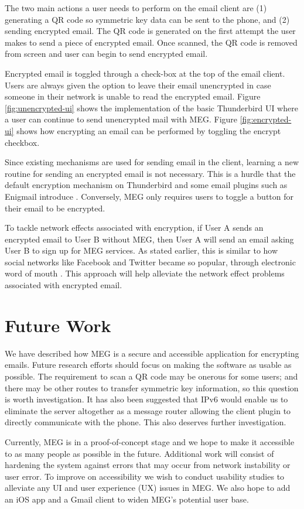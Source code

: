 \documentclass[10pt]{article}
\begin{document}
\begin{multicols}{2}
\par The two main actions a user needs to perform on the email client are (1) generating a QR code so symmetric key data can be sent to the phone, and (2) sending encrypted email. The QR code is generated on the first attempt the user makes to send a piece of encrypted email. Once scanned, the QR code is removed from screen and user can begin to send encrypted email.
\par Encrypted email is toggled through a check-box at the top of the email client. Users are always given the option to leave their email unencrypted in case someone in their network is unable to read the encrypted email. Figure \ref{fig:unencrypted-ui} shows the implementation of the basic Thunderbird UI where a user can continue to send unencrypted mail with MEG. Figure \ref{fig:encrypted-ui} shows how encrypting an email can be performed by toggling the encrypt checkbox.
\par Since existing mechanisms are used for sending email in the client, learning a new routine for sending an encrypted email is not necessary. This is a hurdle that the default encryption mechanism on Thunderbird and some email plugins such as Enigmail introduce \cite{enigmail-handbook}. Conversely, MEG only requires users to toggle a button for their email to be encrypted.
\par To tackle network effects associated with encryption, if User A sends an encrypted email to User B without MEG, then User A will send an email asking User B to sign up for MEG services. As stated earlier, this is similar to how social networks like Facebook and Twitter became so popular, through electronic word of mouth \cite{trusov2009effects}. This approach will help alleviate the network effect problems associated with encrypted email.
\section{Future Work}
\par We have described how MEG is a secure and accessible application for encrypting emails. Future research efforts should focus on making the software as usable as possible. The requirement to scan a QR code may be onerous for some users; and there may be other routes to transfer symmetric key information, so this question is worth investigation. It has also been suggested that IPv6 would enable us to eliminate the server altogether as a message router allowing the client plugin to directly communicate with the phone. This also deserves further investigation.
\par Currently, MEG is in a proof-of-concept stage and we hope to make it accessible to as many people as possible in the future. Additional work will consist of hardening the system against errors that may occur from network instability or user error. To improve on accessibility we wish to conduct usability studies to alleviate any UI and user experience (UX) issues in MEG. We also hope to add an iOS app and a Gmail client to widen MEG's potential user base.


\end{multicols}
\end{document}
